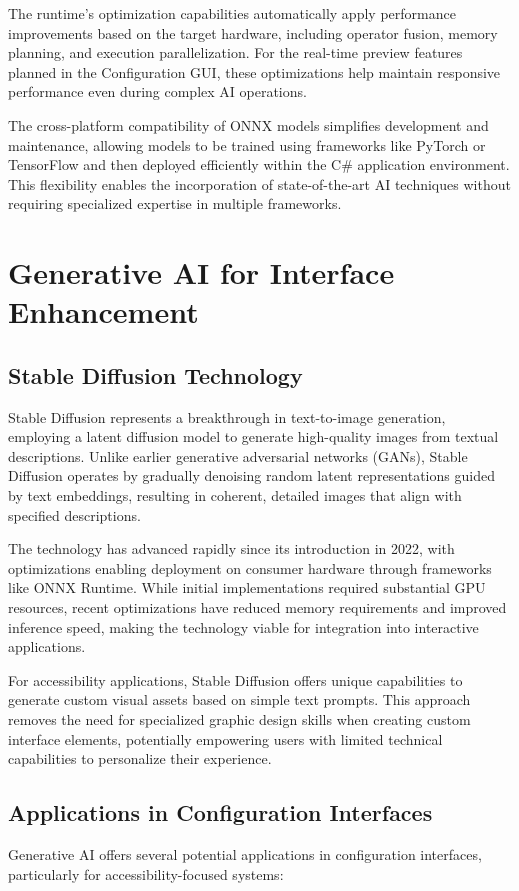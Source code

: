 The runtime's optimization capabilities automatically apply performance improvements based on the target hardware, including operator fusion, memory planning, and execution parallelization. For the real-time preview features planned in the Configuration GUI, these optimizations help maintain responsive performance even during complex AI operations.

The cross-platform compatibility of ONNX models simplifies development and maintenance, allowing models to be trained using frameworks like PyTorch or TensorFlow and then deployed efficiently within the C# application environment. This flexibility enables the incorporation of state-of-the-art AI techniques without requiring specialized expertise in multiple frameworks.

\section{Generative AI for Interface Enhancement}
\subsection{Stable Diffusion Technology}
Stable Diffusion represents a breakthrough in text-to-image generation, employing a latent diffusion model to generate high-quality images from textual descriptions. Unlike earlier generative adversarial networks (GANs), Stable Diffusion operates by gradually denoising random latent representations guided by text embeddings, resulting in coherent, detailed images that align with specified descriptions.

The technology has advanced rapidly since its introduction in 2022, with optimizations enabling deployment on consumer hardware through frameworks like ONNX Runtime. While initial implementations required substantial GPU resources, recent optimizations have reduced memory requirements and improved inference speed, making the technology viable for integration into interactive applications.

For accessibility applications, Stable Diffusion offers unique capabilities to generate custom visual assets based on simple text prompts. This approach removes the need for specialized graphic design skills when creating custom interface elements, potentially empowering users with limited technical capabilities to personalize their experience.

\subsection{Applications in Configuration Interfaces}
Generative AI offers several potential applications in configuration interfaces, particularly for accessibility-focused systems:

